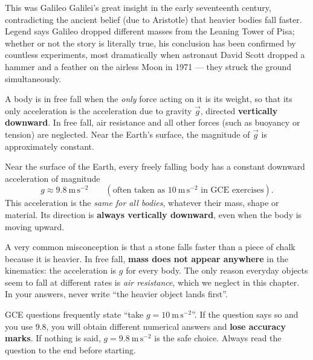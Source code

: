 \documentclass[11pt]{article}
\newcommand{\cle}[1]{{\popxbold\color{popdark}#1}}
\begin{document}
This was Galileo Galilei's great insight in the early seventeenth century, contradicting the ancient belief (due to Aristotle) that heavier bodies fall faster. Legend says Galileo dropped different masses from the Leaning Tower of Pisa; whether or not the story is literally true, his conclusion has been confirmed by countless experiments, most dramatically when astronaut David Scott dropped a hammer and a feather on the airless Moon in 1971 — they struck the ground simultaneously.

\begin{definition}
A body is in \cle{free fall} when the \emph{only} force acting on it is its weight, so that its only acceleration is the acceleration due to gravity $\vec{g}$, directed \textbf{vertically downward}. In free fall, air resistance and all other forces (such as buoyancy or tension) are neglected. Near the Earth's surface, the magnitude of $\vec{g}$ is approximately constant.
\end{definition}

\begin{propriete}
Near the surface of the Earth, every freely falling body has a constant downward acceleration of magnitude
\[
g \approx 9.8\ \mathrm{m\,s^{-2}} \qquad (\text{often taken as } 10\ \mathrm{m\,s^{-2}} \text{ in GCE exercises}).
\]
This acceleration is the \emph{same for all bodies}, whatever their mass, shape or material. Its direction is \textbf{always vertically downward}, even when the body is moving upward.
\end{propriete}

\begin{attention}
A very common misconception is that a stone falls faster than a piece of chalk because it is heavier. In free fall, \textbf{mass does not appear anywhere} in the kinematics: the acceleration is $g$ for every body. The only reason everyday objects seem to fall at different rates is \emph{air resistance}, which we neglect in this chapter. In your answers, never write ``the heavier object lands first''.
\end{attention}

\begin{attention}
GCE questions frequently state ``take $g = 10\ \mathrm{m\,s^{-2}}$''. If the question says so and you use $9.8$, you will obtain different numerical answers and \textbf{lose accuracy marks}. If nothing is said, $g = 9.8\ \mathrm{m\,s^{-2}}$ is the safe choice. Always read the question to the end before starting.
\end{attention}
\end{document}
